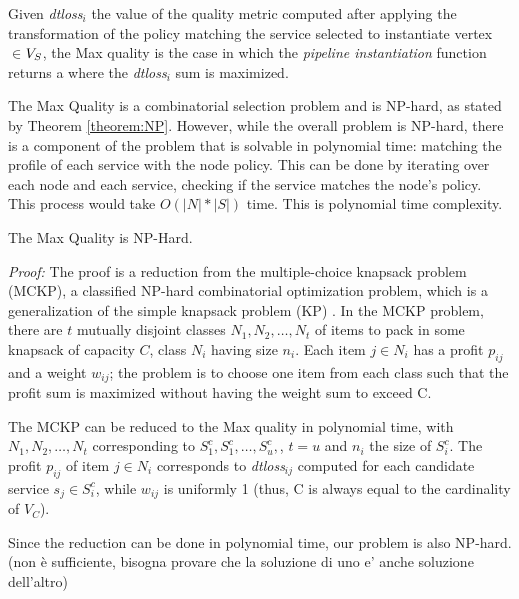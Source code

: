 \begin{definition}\label{def:MaXQualityInstance}
  Given \textit{dtloss}$_i$ the value of the quality metric computed after applying the transformation of the policy matching the service selected to instantiate vertex  $\in$$V_S$, the Max quality \problem is the case in which the \emph{pipeline instantiation} function returns a \pipelineInstance where the \textit{dtloss}$_i$ sum is maximized.
\end{definition}

The Max Quality \problem is a combinatorial selection problem and is NP-hard, as stated by Theorem \ref{theorem:NP}. However, while the overall problem is NP-hard, there is a component of the problem that is solvable in polynomial time: matching the profile of each service with the node policy. This can be done by iterating over each node and each service, checking if the service matches the node’s policy. This process would take $O(|N|*|S|)$ time. This is polynomial time complexity.

\begin{theorem}\label{theorem:NP}
  The Max Quality  \problem is NP-Hard.
\end{theorem}
\emph{Proof: }
The proof is a reduction from the multiple-choice knapsack problem (MCKP), a classified NP-hard combinatorial optimization problem, which is a generalization of the simple knapsack problem (KP) \cite{}. In the MCKP problem, there are $t$ mutually disjoint classes $N_1,N_2,\ldots,N_t$ of items to pack in some knapsack of capacity $C$, class $N_i$ having size $n_i$. Each item $j$$\in$$N_i$ has a profit $p_{ij}$ and a weight $w_{ij}$; the problem is to choose one item from each class such that the profit sum is maximized without having the weight sum to exceed C.

The MCKP can be reduced to the Max quality \problem in polynomial time, with $N_1,N_2,\ldots,N_t$ corresponding to $S^c_{1}, S^c_{1}, \ldots, S^c_{u},$, $t$$=$$u$ and $n_i$ the size of $S^c_{i}$. The profit $p_{ij}$ of item $j$$\in$$N_i$ corresponds to \textit{dtloss}$_{ij}$ computed for each candidate service $s_j$$\in$$S^c_{i}$, while $w_{ij}$ is uniformly 1 (thus, C is always equal to the cardinality of $V_C$).

Since the reduction can be done in polynomial time, our problem is also NP-hard. (non è sufficiente, bisogna provare che la soluzione di uno e' anche soluzione dell'altro)



